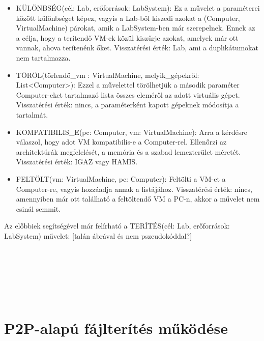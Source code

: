 \begin{itemize}
  \item KÜLÖNBSÉG(cél: Lab, erőforrások: LabSystem): Ez a művelet a paraméterei között különbséget képez, vagyis a Lab-ből kiszedi azokat a (Computer, VirtualMachine) párokat, amik a LabSystem-ben már szerepelnek. Ennek az a célja, hogy a terítendő VM-ek közül kiszűrje azokat, amelyek már ott vannak, ahova terítenénk őket. Visszatérési érték: Lab, ami a duplikátumokat nem tartalmazza.
  \item TÖRÖL(törlendő\_vm : VirtualMachine, melyik\_gépekről: List<Computer>): Ezzel a művelettel törölhetjük a második paraméter Computer-eket tartalmazó lista összes eleméről az adott virtuális gépet. Visszatérési érték: nincs, a paraméterként kapott gépeknek módosítja a tartalmát.
  \item KOMPATIBILIS\_E(pc: Computer, vm: VirtualMachine): Arra a kérdésre válaszol, hogy adot VM kompatibilis-e a Computer-rel. Ellenőrzi az architektúrák megfelelését, a memória és a szabad lemezterület méretét. Visszatérési érték: IGAZ vagy HAMIS.
  \item FELTÖLT(vm: VirtualMachine, pc: Computer): Feltölti a VM-et a Computer-re, vagyis hozzáadja annak a  listájához. Visszatérési érték: nincs, amennyiben már ott található a feltöltendő VM a PC-n, akkor a művelet nem csinál semmit.
\end{itemize}

Az előbbiek segítségével már felírható a TERÍTÉS(cél: Lab, erőforrások: LabSystem) művelet: [talán ábrával és nem pszeudokóddal?]%

\\
\indent {}\\
\indent \indent {}\\
\indent \indent \indent	{}\\
\indent \indent \indent	{}\\
\indent \indent \indent \indent	{}


\section{P2P-alapú fájlterítés működése}
\label{design_apparchi}

